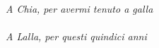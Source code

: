 \begin{titlepage}
	\thispagestyle{empty}
	\topmargin=6.5cm
	\raggedleft
	\large
	\em
	A Chia, per avermi tenuto a galla \\
	~ \\
	A Lalla, per questi quindici anni
	\newpage
	\clearpage{\pagestyle{empty}\cleardoublepage}
\end{titlepage}
